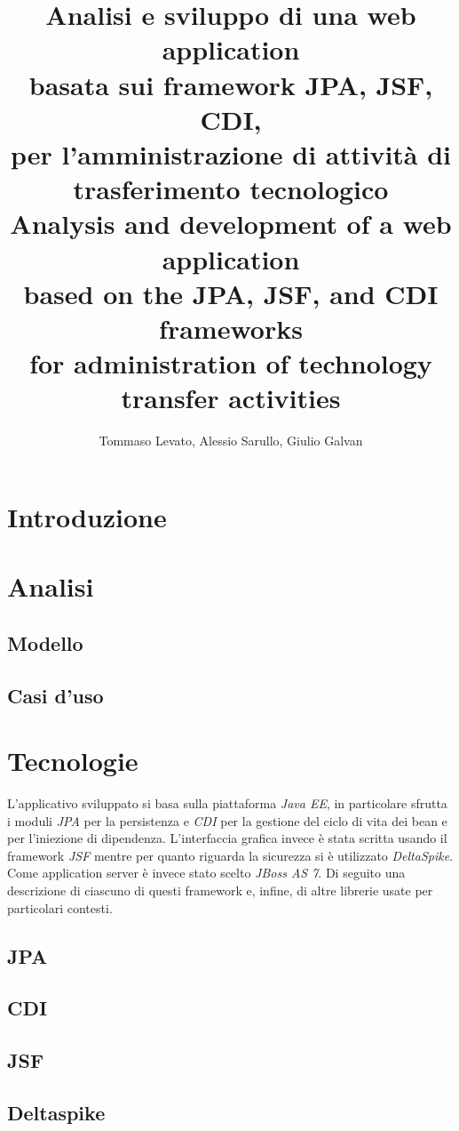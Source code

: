 \documentclass[a4paper,10pt]{report}
\title{Analisi e sviluppo di una web application \\
basata sui framework JPA, JSF, CDI, \\
per l'amministrazione di attività di trasferimento tecnologico\\\vspace{5cm}
Analysis and development of a web application \\
based on the JPA, JSF, and CDI frameworks \\
for administration of technology transfer activities
}
\author{Tommaso Levato, Alessio Sarullo, Giulio Galvan}
\begin{document}
\maketitle

\begin{abstract}
\end{abstract}

\tableofcontents

\chapter{Introduzione}

\chapter{Analisi}
\section{Modello}


\section{Casi d'uso}

\chapter{Tecnologie}
L'applicativo sviluppato si basa sulla piattaforma \textsl{Java EE}, in particolare sfrutta i moduli \textsl{JPA} per la persistenza e \textsl{CDI} per la gestione del ciclo di vita dei bean e per l'iniezione di dipendenza. L'interfaccia grafica
invece è stata scritta usando il framework \textsl{JSF} mentre per quanto riguarda la sicurezza si è utilizzato \textsl{DeltaSpike}. Come application server è invece stato scelto \textsl{JBoss AS 7}. Di seguito una descrizione di ciascuno
di questi framework e, infine, di altre librerie usate per particolari contesti.
\label{chapter:Tecnologie}
\section{JPA}
\label{jpa}

\section{CDI} 
\label{cdi}

\section{JSF}
\label{jsf}

\section{Deltaspike}
\label{delta}

\end{document}
